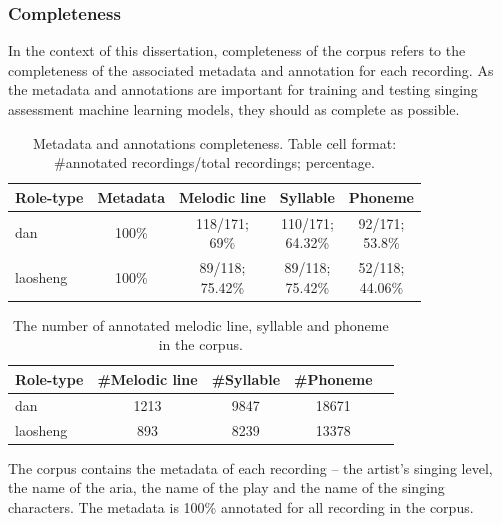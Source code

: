 \subsubsection{Completeness}

In the context of this dissertation, completeness of the corpus refers to the completeness of the associated metadata and annotation for each recording. As the metadata and annotations are important for training and testing singing assessment machine learning models, they should as complete as possible. 

\begin{table}[ht]
    \centering
    \caption{Metadata and annotations completeness. Table cell format: \#annotated recordings/total recordings; percentage.}
    \label{table:ch4:metadata_completeness}
    \begin{tabular}{l|cccc}
        \toprule
        Role-type & Metadata & Melodic line & Syllable & Phoneme \\
        \midrule
        dan           & 100\% & \makecell{118/171;\\69\%} 	& \makecell{110/171;\\64.32\%} 	& \makecell{92/171;\\53.8\%} \\
        \hline
        laosheng      & 100\% & \makecell{89/118;\\75.42\%} & \makecell{89/118;\\75.42\%} 	& \makecell{52/118;\\44.06\%} \\
        \bottomrule
    \end{tabular}
\end{table}

\begin{table}[ht]
    \centering
    \caption{The number of annotated melodic line, syllable and phoneme in the corpus.}
    \label{table:ch4:annotated_number}
    \begin{tabular}{l|cccc}
        \toprule
        Role-type & \#Melodic line & \#Syllable & \#Phoneme \\
        \midrule
        dan           & 1213 	& 9847 	& 18671  	\\
        laosheng      & 893 	& 8239 	& 13378 	\\
        \bottomrule
    \end{tabular}
\end{table}

The corpus contains the metadata of each recording -- the artist's singing level, the name of the aria, the name of the play and the name of the singing characters. The metadata is 100\% annotated for all recording in the corpus.

